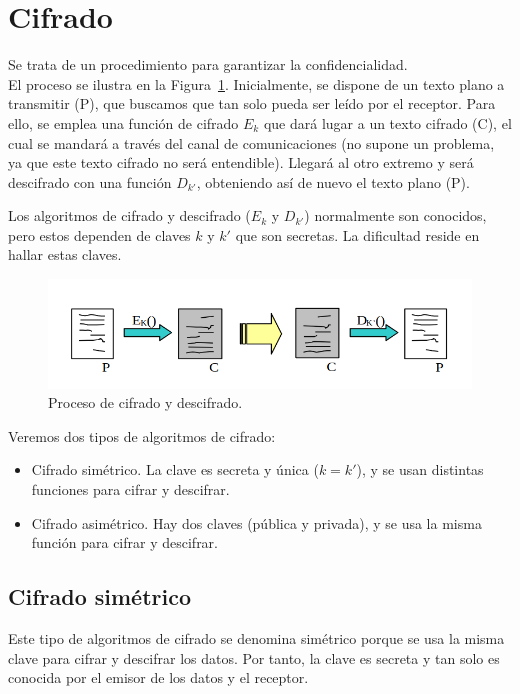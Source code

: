 \section{Cifrado}
Se trata de un procedimiento para garantizar la confidencialidad.\\


El proceso se ilustra en la Figura~\ref{fig:cifrado/descifrado}. Inicialmente, se dispone de un texto plano a transmitir (P), que buscamos que tan solo pueda ser leído por el receptor. Para ello, se emplea una función de cifrado $E_k$ que dará lugar a un texto cifrado (C), el cual se mandará a través del canal de comunicaciones (no supone un problema, ya que este texto cifrado no será entendible). Llegará al otro extremo y será descifrado con una función $D_{k'}$, obteniendo así de nuevo el texto plano (P).

Los algoritmos de cifrado y descifrado ($E_k$ y $D_{k'}$) normalmente son conocidos, pero estos dependen de claves $k$ y $k'$ que son secretas. La dificultad reside en hallar estas claves.
\begin{figure}[H]
    \centering
    \includegraphics[width=1\linewidth]{./images/cifrado.png}
    \caption{Proceso de cifrado y descifrado.}
    \label{fig:cifrado/descifrado}
\end{figure}

Veremos dos tipos de algoritmos de cifrado:
\begin{itemize}
    \item Cifrado simétrico. La clave es secreta y única ($k=k'$), y se usan distintas funciones para cifrar y descifrar.
    \item Cifrado asimétrico. Hay dos claves (pública y privada), y se usa la misma función para cifrar y descifrar.
\end{itemize}

\subsection{Cifrado simétrico}

Este tipo de algoritmos de cifrado se denomina simétrico porque se usa la misma clave para cifrar y descifrar los datos. Por tanto, la clave es secreta y tan solo es conocida por el emisor de los datos y el receptor.

